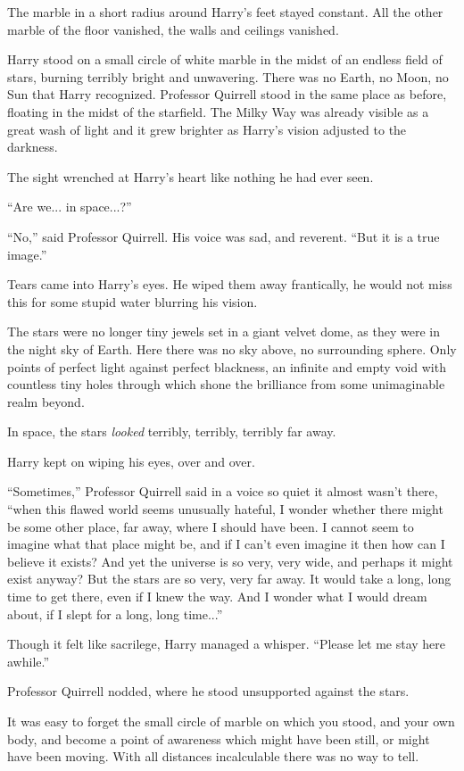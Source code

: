 The marble in a short radius around Harry's feet stayed constant. All the other marble of the floor vanished, the walls and ceilings vanished.

Harry stood on a small circle of white marble in the midst of an endless field of stars, burning terribly bright and unwavering. There was no Earth, no Moon, no Sun that Harry recognized. Professor Quirrell stood in the same place as before, floating in the midst of the starfield. The Milky Way was already visible as a great wash of light and it grew brighter as Harry's vision adjusted to the darkness.

The sight wrenched at Harry's heart like nothing he had ever seen.

``Are we... in space...?''

``No,'' said Professor Quirrell. His voice was sad, and reverent. ``But it is a true image.''

Tears came into Harry's eyes. He wiped them away frantically, he would not miss this for some stupid water blurring his vision.

The stars were no longer tiny jewels set in a giant velvet dome, as they were in the night sky of Earth. Here there was no sky above, no surrounding sphere. Only points of perfect light against perfect blackness, an infinite and empty void with countless tiny holes through which shone the brilliance from some unimaginable realm beyond.

In space, the stars \emph{looked} terribly, terribly, terribly far away.

Harry kept on wiping his eyes, over and over.

``Sometimes,'' Professor Quirrell said in a voice so quiet it almost wasn't there, ``when this flawed world seems unusually hateful, I wonder whether there might be some other place, far away, where I should have been. I cannot seem to imagine what that place might be, and if I can't even imagine it then how can I believe it exists? And yet the universe is so very, very wide, and perhaps it might exist anyway? But the stars are so very, very far away. It would take a long, long time to get there, even if I knew the way. And I wonder what I would dream about, if I slept for a long, long time...''

Though it felt like sacrilege, Harry managed a whisper. ``Please let me stay here awhile.''

Professor Quirrell nodded, where he stood unsupported against the stars.

It was easy to forget the small circle of marble on which you stood, and your own body, and become a point of awareness which might have been still, or might have been moving. With all distances incalculable there was no way to tell.

